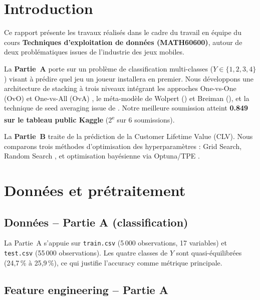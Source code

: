 \documentclass[11pt,a4paper]{article}
\newcommand{\code}[1]{\texttt{\small #1}}
\begin{document}
\newpage
\setcounter{page}{1}

\section{Introduction}

Ce rapport présente les travaux réalisés dans le cadre du travail en équipe
du cours \textbf{Techniques d'exploitation de données (MATH60600)}, autour
de deux problématiques issues de l'industrie des jeux mobiles.

La \textbf{Partie~A} porte sur un problème de classification multi-classes
($Y \in \{1,2,3,4\}$) visant à prédire quel jeu un joueur installera en
premier. Nous développons une architecture de stacking à trois niveaux
intégrant les approches One-vs-One (OvO) et One-vs-All (OvA)
\parencite{galar2011}, le méta-modèle de Wolpert (\citeyear{wolpert1992})
et Breiman (\citeyear{breiman1996}), et la technique de seed averaging
issue de \textcite{izmailov2018}. Notre meilleure soumission atteint
\textbf{0.849 sur le tableau public Kaggle} (2\textsuperscript{e} sur 6
soumissions).

La \textbf{Partie~B} traite de la prédiction de la Customer Lifetime Value
(CLV). Nous comparons trois méthodes d'optimisation des hyperparamètres :
Grid Search, Random Search \parencite{bergstra2012}, et optimisation
bayésienne via Optuna/TPE \parencite{akiba2019}.

\section{Données et prétraitement}

\subsection{Données -- Partie A (classification)}

La Partie~A s'appuie sur \code{train.csv} (5\,000 observations, 17 variables)
et \code{test.csv} (55\,000 observations). Les quatre classes de $Y$ sont
quasi-équilibrées (24,7\,\% à 25,9\,\%), ce qui justifie l'accuracy comme
métrique principale.

\subsection{Feature engineering -- Partie A}
\end{document}
